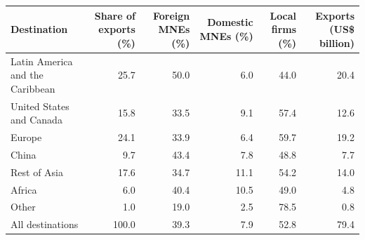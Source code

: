 \begin{tabular}{lrrrrr}
\toprule
Destination & Share of exports (\%) & Foreign MNEs (\%) & Domestic MNEs (\%) & Local firms (\%) & Exports (US\$ billion) \\
\midrule
Latin America and the Caribbean & 25.7 & 50.0 & 6.0 & 44.0 & 20.4 \\
United States and Canada & 15.8 & 33.5 & 9.1 & 57.4 & 12.6 \\
Europe & 24.1 & 33.9 & 6.4 & 59.7 & 19.2 \\
China & 9.7 & 43.4 & 7.8 & 48.8 & 7.7 \\
Rest of Asia & 17.6 & 34.7 & 11.1 & 54.2 & 14.0 \\
Africa & 6.0 & 40.4 & 10.5 & 49.0 & 4.8 \\
Other & 1.0 & 19.0 & 2.5 & 78.5 & 0.8 \\
\midrule
All destinations & 100.0 & 39.3 & 7.9 & 52.8 & 79.4 \\
\bottomrule
\end{tabular}
